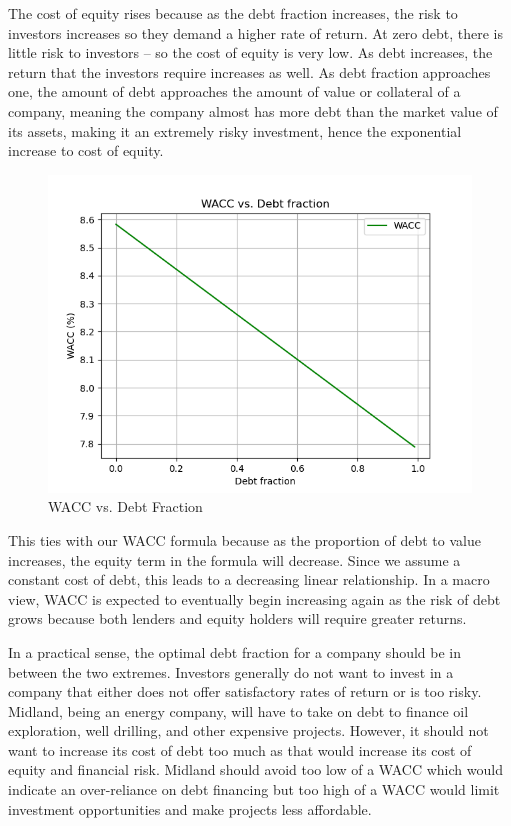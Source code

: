 \documentclass[letterpaper]{article}
\begin{document}
The cost of equity rises because as the debt fraction increases, the risk to investors increases so they demand a higher rate of return. At zero debt, there is little risk to investors -- so the cost of equity is very low. As debt increases, the return that the investors require increases as well. As debt fraction approaches one, the amount of debt approaches the amount of value or collateral of a company, meaning the company almost has more debt than the market value of its assets, making it an extremely risky investment, hence the exponential increase to cost of equity. 
\color{black}

\begin{figure}[H]
    \includegraphics[width=\linewidth]{images/wacc.png}
    \caption{WACC vs. Debt Fraction}
\end{figure}

This ties with our WACC formula because as the proportion of debt to value increases, the equity term in the formula will decrease. Since we assume a constant cost of debt, this leads to a decreasing linear relationship. In a macro view, WACC is expected to eventually begin increasing again as the risk of debt grows because both lenders and equity holders will require greater returns. 

In a practical sense, the optimal debt fraction for a company should be in between the two extremes. Investors generally do not want to invest in a company that either does not offer satisfactory rates of return or is too risky. Midland, being an energy company, will have to take on debt to finance oil exploration, well drilling, and other expensive projects. However, it should not want to increase its cost of debt too much as that would increase its cost of equity and financial risk. Midland should avoid too low of a WACC which would indicate an over-reliance on debt financing but too high of a WACC would limit investment opportunities and make projects less affordable. 
\end{document}

